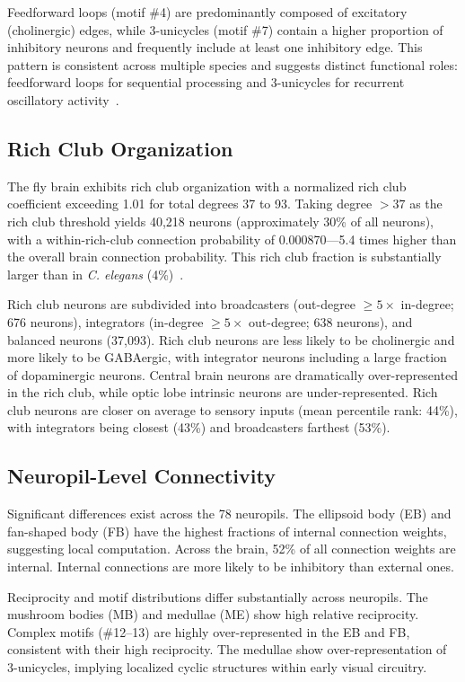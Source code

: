 \documentclass[11pt]{article}
\begin{document}
Feedforward loops (motif \#4) are predominantly composed of excitatory (cholinergic) edges, while 3-unicycles (motif \#7) contain a higher proportion of inhibitory neurons and frequently include at least one inhibitory edge. This pattern is consistent across multiple species and suggests distinct functional roles: feedforward loops for sequential processing and 3-unicycles for recurrent oscillatory activity~\citep{vishwanathan2023cyclic}.

\subsection{Rich Club Organization}

The fly brain exhibits rich club organization with a normalized rich club coefficient exceeding 1.01 for total degrees 37 to 93. Taking degree $>37$ as the rich club threshold yields 40,218 neurons (approximately 30\% of all neurons), with a within-rich-club connection probability of 0.000870---5.4 times higher than the overall brain connection probability. This rich club fraction is substantially larger than in \textit{C. elegans} (4\%)~\citep{towlson2013richclub}.

Rich club neurons are subdivided into broadcasters (out-degree $\geq 5\times$ in-degree; 676 neurons), integrators (in-degree $\geq 5\times$ out-degree; 638 neurons), and balanced neurons (37,093). Rich club neurons are less likely to be cholinergic and more likely to be GABAergic, with integrator neurons including a large fraction of dopaminergic neurons. Central brain neurons are dramatically over-represented in the rich club, while optic lobe intrinsic neurons are under-represented. Rich club neurons are closer on average to sensory inputs (mean percentile rank: 44\%), with integrators being closest (43\%) and broadcasters farthest (53\%).

\subsection{Neuropil-Level Connectivity}

Significant differences exist across the 78 neuropils. The ellipsoid body (EB) and fan-shaped body (FB) have the highest fractions of internal connection weights, suggesting local computation. Across the brain, 52\% of all connection weights are internal. Internal connections are more likely to be inhibitory than external ones.

Reciprocity and motif distributions differ substantially across neuropils. The mushroom bodies (MB) and medullae (ME) show high relative reciprocity. Complex motifs (\#12--13) are highly over-represented in the EB and FB, consistent with their high reciprocity. The medullae show over-representation of 3-unicycles, implying localized cyclic structures within early visual circuitry.
\end{document}
